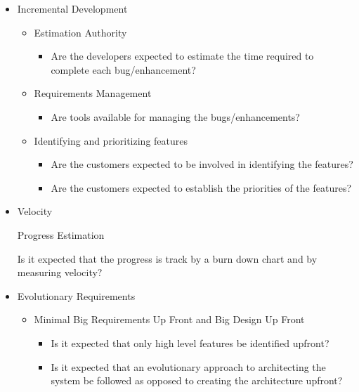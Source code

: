 \begin{appendices}
\begin{itemize}
\begin{itemize}
\begin{itemize}
				\end{itemize}
		\end{itemize}
	\item Incremental Development
		\begin{itemize}
			\item Estimation Authority
				\begin{itemize}
					\item Are the developers expected to estimate the time required to complete each bug/enhancement?
				\end{itemize}
			\item Requirements Management
				\begin{itemize}
					\item Are tools available for managing the bugs/enhancements?
				\end{itemize}
			\item Identifying and prioritizing features
				\begin{itemize}
					\item Are the customers expected to be involved in identifying the features?
					\item Are the customers expected to establish the priorities of the features?
				\end{itemize}
		\end{itemize}
	\item Velocity
		\begin{itemize}
			\addition Progress Estimation
				\begin{itemize}
					\addition Is it expected that the progress is track by a burn down chart and by measuring velocity?
				\end{itemize}
		\end{itemize}
	\item Evolutionary Requirements
		\begin{itemize}
			\item Minimal Big Requirements Up Front and Big Design Up Front
				\begin{itemize}
					\item Is it expected that only high level features be identified upfront?
					\item Is it expected that an evolutionary approach to architecting the system be followed as opposed to creating the architecture upfront?

\end{itemize}
\end{itemize}
\end{itemize}
\end{appendices}

